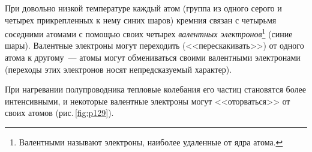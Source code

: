 \documentclass[main.tex]{subfiles}
\begin{document}
При довольно низкой температуре каждый атом (группа из одного серого и четырех прикрепленных к нему синих шаров) кремния связан с четырьмя соседними атомами с помощью своих четырех \emph{валентных электронов}\footnote{Валентными называют электроны, наиболее удаленные от ядра атома.} (синие шары). Валентные электроны могут переходить (<<перескакивать>>) от одного атома к другому~--- атомы могут обмениваться своими валентными электронами (переходы этих электронов носят непредсказуемый характер).


При нагревании полупроводника тепловые колебания его частиц становятся более интенсивными, и некоторые валентные электроны могут <<оторваться>> от своих атомов (рис.\,\ref{fig:p129}). 

\end{document}
